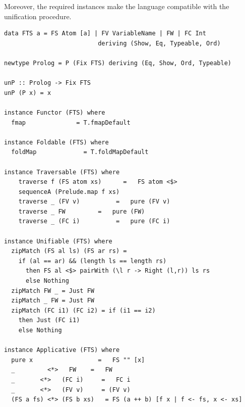 \documentclass[thesis-solanki.tex]{subfiles}
\begin{document}
Moreover, the required instances make the language compatible with the unification procedure.

\begin{verbatim}
data FTS a = FS Atom [a] | FV VariableName | FW | FC Int
                          deriving (Show, Eq, Typeable, Ord)

newtype Prolog = P (Fix FTS) deriving (Eq, Show, Ord, Typeable)

unP :: Prolog -> Fix FTS
unP (P x) = x

instance Functor (FTS) where
  fmap              = T.fmapDefault

instance Foldable (FTS) where
  foldMap             = T.foldMapDefault

instance Traversable (FTS) where
    traverse f (FS atom xs)      =   FS atom <$>
    sequenceA (Prelude.map f xs)
    traverse _ (FV v)          =   pure (FV v)
    traverse _ FW         =   pure (FW)
    traverse _ (FC i)          =   pure (FC i)

instance Unifiable (FTS) where
  zipMatch (FS al ls) (FS ar rs) =
    if (al == ar) && (length ls == length rs)
      then FS al <$> pairWith (\l r -> Right (l,r)) ls rs
      else Nothing
  zipMatch FW _ = Just FW
  zipMatch _ FW = Just FW
  zipMatch (FC i1) (FC i2) = if (i1 == i2)
    then Just (FC i1)
    else Nothing

instance Applicative (FTS) where
  pure x                  =   FS "" [x]
  _         <*>   FW    =   FW
  _       <*>   (FC i)     =   FC i
  _       <*>   (FV v)     = (FV v)
  (FS a fs) <*> (FS b xs)   = FS (a ++ b) [f x | f <- fs, x <- xs]
\end{verbatim}
\end{document}
